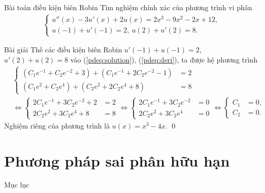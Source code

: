 \documentclass[9pt]{beamer}
\numberwithin{equation}{section}
\begin{document}
\begin{frame}
\begin{block}{Bài toán điều kiện biên Robin}
    Tìm nghiệm chính xác của phương trình vi phân
    \begin{align*}
        \begin{cases}
        u''(x) - 3u'(x) + 2u(x) = 2x^3 - 9x^2 - 2x + 12, \\
        u(-1) + u'(-1) = 2, \ u(2) + u'(2) = 8.
        \end{cases}
    \end{align*}
\end{block}
\begin{exampleblock}{Bài giải}
    Thế các điều kiện biên Robin $u'(-1) + u(-1) = 2$, $u'(2) + u(2) = 8$ vào (\ref{pdeq:solution}), (\ref{pdeq:deri}), ta được hệ phương trình
    \begin{align*}
        &\begin{cases}
        (C_1 e^{-1} + C_2 e^{-2} + 3) + (C_1 e^{-1} + 2C_2 e^{-2} - 1) &= 2 \\
        (C_1 e^2 + C_2 e^4) + (C_2 e^2 + 2C_2 e^4 + 8) &= 8
        \end{cases} \\
        &\Leftrightarrow
        \begin{cases}
        2C_1 e^{-1} + 3C_2 e^{-2} + 2 &= 2 \\
        2C_2 e^2 + 3C_2 e^4 + 8 &= 8
        \end{cases} \Leftrightarrow
        \begin{cases}
        2C_1 e^{-1} + 3C_2 e^{-2} &= 0 \\
        2C_2 e^2 + 3C_2 e^4 &= 0
        \end{cases} \Leftrightarrow
        \begin{cases}
        C_1 &= 0, \\ C_2 &= 0.
        \end{cases}
    \end{align*}
    Nghiệm riêng của phương trình là $u(x) = x^3 - 4x.$ \hfill \qed
\end{exampleblock}
\end{frame}

\section{Phương pháp sai phân hữu hạn}

\begin{frame}{Mục lục}
    \tableofcontents[currentsection, sections={1-2}]
\end{frame}
\end{document}
